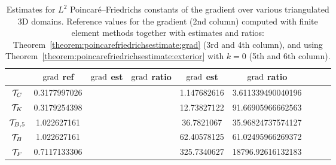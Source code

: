 \documentclass[10pt,a4paper]{article}
\begin{document}
\begin{table}[t]
    \color{red}
    \centering
    \begin{tabular}{|c|c|c|c|c|c|c|c|c|}
        \hline
                        & $\operatorname{grad}$ ref  & $\operatorname{grad}$ est & $\operatorname{grad}$ ratio      & $\operatorname{grad}$ est & $\operatorname{grad}$ ratio       \\ 
        \hline
        ${\mathcal T}_{C}$     & 0.3177997026 &             &                    &  1.147682616 & 3.611339490040196  \\ 
        \hline
        ${\mathcal T}_{K}$     & 0.3179254398 &             &                    & 12.73827122  & 91.66905966662563  \\ 
        \hline
        ${\mathcal T}_{B,5}$   & 1.022627161  &             &                    & 36.7821067   & 35.96824737574127  \\ 
        \hline
        ${\mathcal T}_{B}$     & 1.022627161  &             &                    & 62.40578125  & 61.02495966269372  \\ 
        \hline
        ${\mathcal T}_{F}$     & 0.7117133306 &             &                    & 325.7340627  & 18796.92616132183  \\ 
        \hline
    \end{tabular} 
    \caption{
    Estimates for $L^2$ Poincar\'e--Friedrichs constants of the gradient over various triangulated 3D domains.
    Reference values for the gradient (2nd column) computed with finite element methods together with estimates and ratios: 
    Theorem~\ref{theorem:poincarefriedrichsestimate:grad} (3rd and 4th column), and using Theorem~\ref{theorem:poincarefriedrichsestimate:exterior} with $k=0$ (5th and 6th column).
    }\label{table:estimates3D:grad}
\end{table}
  
\end{document}

